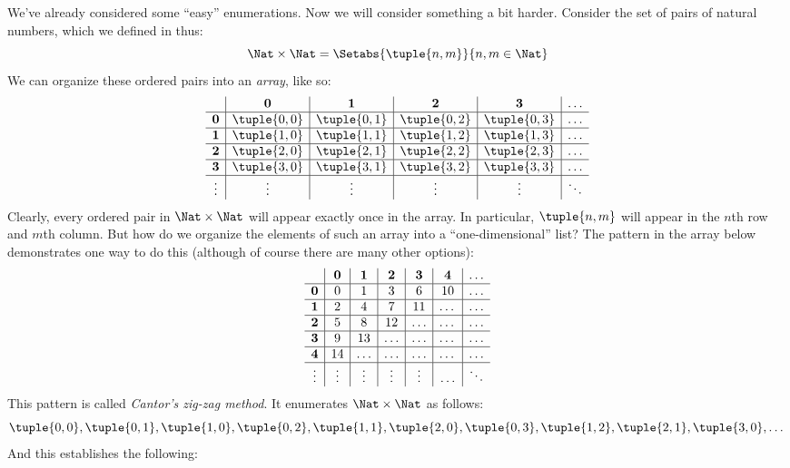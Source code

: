 

\begin{explain}
We've already considered some ``easy'' enumerations. Now we will
consider something a bit harder. Consider the set of pairs of natural
numbers, which we defined in
 thus:
\[
\Nat \times \Nat = \Setabs{\tuple{n,m}}{n,m \in \Nat}
\]
We can organize these ordered pairs into an \emph{array}, like so:
\[
\begin{array}{ c | c | c | c | c | c}
& \mathbf 0 & \mathbf 1 & \mathbf 2 & \mathbf 3 & \dots \\
\hline
\mathbf 0 & \tuple{0,0} & \tuple{0,1} & \tuple{0,2} & \tuple{0,3} & \dots \\
\hline
\mathbf 1 & \tuple{1,0} & \tuple{1,1} & \tuple{1,2} & \tuple{1,3} & \dots \\
\hline
\mathbf 2 & \tuple{2,0} & \tuple{2,1} & \tuple{2,2} & \tuple{2,3} & \dots \\
\hline
\mathbf 3 & \tuple{3,0} & \tuple{3,1} & \tuple{3,2} & \tuple{3,3} & \dots \\
\hline
\vdots & \vdots & \vdots & \vdots & \vdots & \ddots\\
\end{array}
\]
Clearly, every ordered pair in $\Nat \times \Nat$ will appear
exactly once in the array. In particular, $\tuple{n,m}$ will appear in
the $n$th row and $m$th column. But how do we organize the elements of
such an array into a ``one-dimensional'' list? The pattern in the array below
demonstrates one way to do this (although of course there are many other options):
\[
\begin{array}{ c | c | c | c | c | c | c}
& \mathbf 0 & \mathbf 1 & \mathbf 2 & \mathbf 3 & \mathbf 4 &\dots \\
\hline
\mathbf 0 & 0  & 1& 3 & 6& 10 &\ldots \\
\hline
\mathbf 1 &2 & 4& 7 & 11 & \dots &\ldots \\
\hline
\mathbf 2 & 5 & 8 & 12 & \ldots & \dots&\ldots \\
\hline
\mathbf 3 & 9 & 13 & \ldots & \ldots & \dots & \ldots \\
\hline
\mathbf 4 & 14 & \ldots & \ldots & \ldots & \dots & \ldots \\
\hline
\vdots & \vdots & \vdots & \vdots & \vdots&\ldots & \ddots\\
\end{array}
\]\noindent
This pattern is called \emph{Cantor's zig-zag method}. It  enumerates
$\Nat \times \Nat$ as follows:
\[
\tuple{0,0}, \tuple{0,1}, \tuple{1,0}, \tuple{0,2}, \tuple{1,1},
\tuple{2,0}, \tuple{0,3}, \tuple{1,2}, \tuple{2,1}, \tuple{3,0}, \dots
\]
And this establishes the following:
\end{explain}


